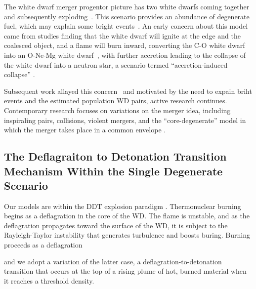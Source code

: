 \documentclass[iop,apj]{emulateapj}
\begin{document}
The white dwarf merger progentor picture has two white dwarfs coming 
together and subsequently exploding~\citep{tutukovyungelson76,tutukovyungelson79,
webbink84,ibentutukov84}. This scenario provides an abundance of degenerate fuel, 
which may explain some bright events~\citep{scalzo:2010,Yuan:2010}. 
An early concern about this model came from studies finding that
the white dwarf will ignite at the edge and the coalesced object, 
and a flame will burn inward, converting the C-O white dwarf into 
an O-Ne-Mg white dwarf~\citep{saionomoto1985,saionomoto2004}, with
further accretion leading to the collapse of the white dwarf
into a neutron star, a scenario termed ``accretion-induced collapse''
\citep{nomotokondo1991}.

Subsequent work allayed this concern~\citep{yoonetal2007,lorenaguilaretal2009,
Shenetal12, pakmoretal2012b} and motivated by the need to expain briht events
and the estimated population WD pairs, active research continues. Contemporary
research focuses on variations on the merger idea, including 
inspiraling pairs, collisions, violent mergers,
and the ``core-degenerate'' model in which the merger takes place in
a common envelope \citep{raskinetal2009,pakmoretal2011,kashi:2011,pakmoretal2012a,Shenetal12,katzetal2016}.


\subsection{The Deflagraiton to Detonation Transition Mechanism Within the Single Degenerate Scenario}

Our models are within the DDT explosion paradigm \cite{1986SvAL,
Khokhlov1991Delayed-detonat,NiemWoos97,Niem99,belletal2004, fishjump2015}. 
Thermonuclear burning begins as a deflagration in the core of the WD.
The flame is unstable, and as the deflagration propagates toward the surface
of the WD, it is subject to the Rayleigh-Taylor instability that generates
turbulence and boosts buring.  
Burning proceeds as a deflagration


and we 
adopt a variation of the latter case, a deflagration-to-detonation transition
that occurs at the top of a rising plume of hot, burned material when it
reaches a threshold density.
\end{document}
